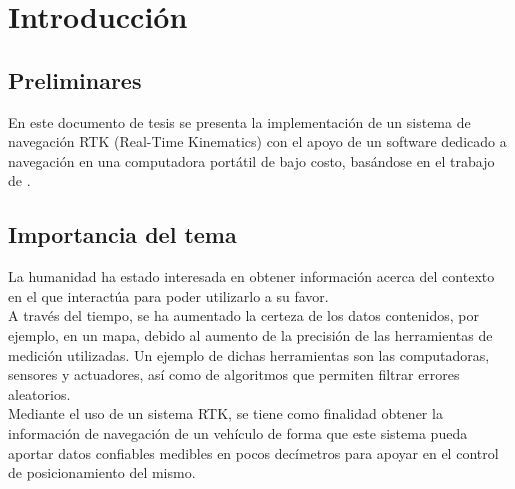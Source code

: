 
\chapter{Introducción} %

\label{Chap:Intro} %


\newcommand{\keyword}[1]{\textbf{#1}}
\newcommand{\tabhead}[1]{\textbf{#1}}
\newcommand{\code}[1]{\texttt{#1}}
\newcommand{\file}[1]{\texttt{\bfseries#1}}
\newcommand{\option}[1]{\texttt{\itshape#1}}


\section{Preliminares}
En este documento de tesis se presenta la implementación de un sistema de navegación RTK (Real-Time Kinematics\footnotemark) con el apoyo de un software dedicado a navegación en una computadora portátil de bajo costo, basándose en el trabajo de \cite{takasu2009development}.


\section{Importancia del tema}
La humanidad ha estado interesada en obtener información acerca del contexto en el que interactúa para poder utilizarlo a su favor. \\

A través del tiempo, se ha aumentado la certeza de los datos contenidos, por ejemplo, en un mapa, debido al aumento de la precisión de las herramientas de medición utilizadas. Un ejemplo de dichas herramientas son las computadoras, sensores y actuadores, así como de algoritmos que permiten filtrar errores aleatorios. \\

Mediante el uso de un sistema RTK, se tiene como finalidad obtener la información de navegación de un vehículo de forma que este sistema pueda aportar datos confiables medibles en pocos decímetros para apoyar en el control de posicionamiento del mismo.

